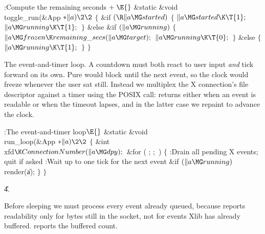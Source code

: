 \Y\B\4:Compute the remaining seconds\X${}\mathrel+\E{}$\6
\1\1\&{static} \&{void} \\{toggle\_run}(\&{App} ${}{*}\|a)\2\2{}$\6
${}\{{}$\1\6
\&{if} ${}(\R\|a\MG\\{started}){}$\5
${}\{{}$\1\6
${}\|a\MG\\{started}\K\T{1};{}$\6
${}\|a\MG\\{running}\K\T{1};{}$\6
\4${}\}{}$\2\6
\&{else} \&{if} ${}(\|a\MG\\{running}){}$\5
${}\{{}$\1\6
${}\|a\MG\\{frozen}\K\\{remaining\_secs}(\|a\MG\\{target});{}$\6
${}\|a\MG\\{running}\K\T{0};{}$\6
\4${}\}{}$\2\6
\&{else}\5
${}\{{}$\1\6
${}\|a\MG\\{running}\K\T{1};{}$\6
\4${}\}{}$\2\6
\4${}\}{}$\2\par
\fi

The event-and-timer loop.
A countdown must both react to user input {\it and\/} tick forward on its
own.  Pure  would block until the next event, so the clock
would freeze whenever the user sat still.  Instead we multiplex the X
connection's file descriptor against a timer using the POSIX 
call:  returns either when an event is readable or when the
timeout lapses, and in the latter case we repaint to advance the clock.

\Y\B\4:The event-and-timer loop\X${}\E{}$\6
\1\1\&{static} \&{void} \\{run\_loop}(\&{App} ${}{*}\|a)\2\2{}$\6
${}\{{}$\1\6
\&{int} \\{xfd}${}\K\\{ConnectionNumber}(\|a\MG\\{dpy});{}$\7
\&{for} ( ;  ; \,)\5
${}\{{}$\1\6
:Drain all pending X events; quit if asked\X\6
:Wait up to one tick for the next event\X\6
\&{if} ${}(\|a\MG\\{running}){}$\1\5
\\{render}(\|a);\2\6
\4${}\}{}$\2\6
\4${}\}{}$\2\par
\U4.\fi

Before sleeping we must process every event already queued, because
 reports readability only for bytes still in the socket, not for
events Xlib has already buffered.   reports the buffered
count.

